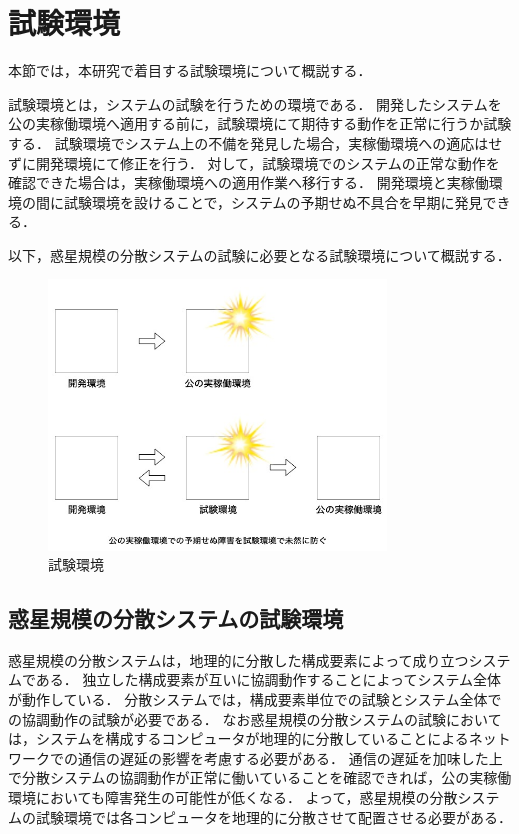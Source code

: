 \section{試験環境}
\label{bg:staging}

本節では，本研究で着目する試験環境について概説する．

試験環境とは，システムの試験を行うための環境である．
開発したシステムを公の実稼働環境へ適用する前に，試験環境にて期待する動作を正常に行うか試験する．
試験環境でシステム上の不備を発見した場合，実稼働環境への適応はせずに開発環境にて修正を行う．
対して，試験環境でのシステムの正常な動作を確認できた場合は，実稼働環境への適用作業へ移行する．
開発環境と実稼働環境の間に試験環境を設けることで，システムの予期せぬ不具合を早期に発見できる．

以下，惑星規模の分散システムの試験に必要となる試験環境について概説する．

\begin{figure}[htbp]
  \begin{center}
    \includegraphics[width=0.8\textwidth]{./figures/staging.jpg}
    \caption{試験環境}
  \end{center}
\end{figure}

\subsection{惑星規模の分散システムの試験環境}
\label{bg:staging:planetary-scale-distributed-system}

惑星規模の分散システムは，地理的に分散した構成要素によって成り立つシステムである．
独立した構成要素が互いに協調動作することによってシステム全体が動作している．
分散システムでは，構成要素単位での試験とシステム全体での協調動作の試験が必要である．
なお惑星規模の分散システムの試験においては，システムを構成するコンピュータが地理的に分散していることによるネットワークでの通信の遅延の影響を考慮する必要がある．
通信の遅延を加味した上で分散システムの協調動作が正常に働いていることを確認できれば，公の実稼働環境においても障害発生の可能性が低くなる．
よって，惑星規模の分散システムの試験環境では各コンピュータを地理的に分散させて配置させる必要がある．


